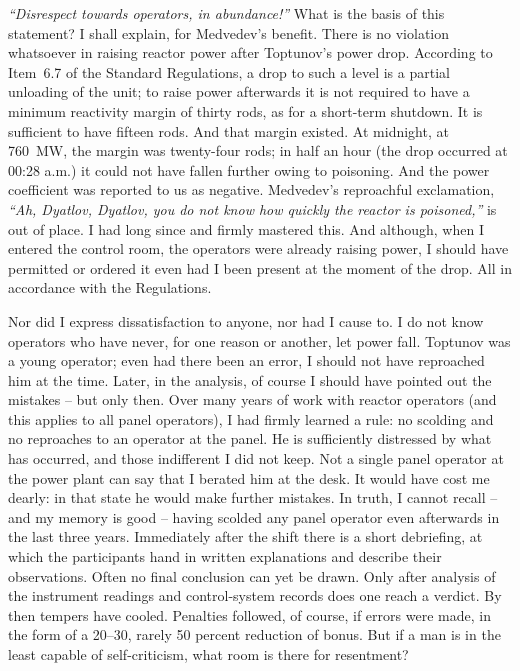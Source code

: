 \documentclass[openright]{bookest}
\begin{document}
\textit{``Disrespect towards operators, in abundance!''} What is the basis of this statement? I shall explain, for Medvedev's benefit. There is no violation whatsoever in raising reactor power after Toptunov's power drop. According to Item~6.7 of the Standard Regulations, a drop to such a level is a partial unloading of the unit; to raise power afterwards it is not required to have a minimum reactivity margin of thirty rods, as for a short-term shutdown. It is sufficient to have fifteen rods. And that margin existed. At midnight, at \qty{760}{\mega\watt}, the margin was twenty-four rods; in half an hour (the drop occurred at 00:28 a.m.) it could not have fallen further owing to poisoning. And the power coefficient was reported to us as negative. Medvedev's reproachful exclamation, \textit{``Ah, Dyatlov, Dyatlov, you do not know how quickly the reactor is poisoned,''} is out of place. I had long since and firmly mastered this. And although, when I entered the control room, the operators were already raising power, I should have permitted or ordered it even had I been present at the moment of the drop. All in accordance with the Regulations.

Nor did I express dissatisfaction to anyone, nor had I cause to. I do not know operators who have never, for one reason or another, let power fall. Toptunov was a young operator; even had there been an error, I should not have reproached him at the time. Later, in the analysis, of course I should have pointed out the mistakes -- but only then. Over many years of work with reactor operators (and this applies to all panel operators), I had firmly learned a rule: no scolding and no reproaches to an operator at the panel. He is sufficiently distressed by what has occurred, and those indifferent I did not keep. Not a single panel operator at the power plant can say that I berated him at the desk. It would have cost me dearly: in that state he would make further mistakes. In truth, I cannot recall -- and my memory is good -- having scolded any panel operator even afterwards in the last three years. Immediately after the shift there is a short debriefing, at which the participants hand in written explanations and describe their observations. Often no final conclusion can yet be drawn. Only after analysis of the instrument readings and control-system records does one reach a verdict. By then tempers have cooled. Penalties followed, of course, if errors were made, in the form of a \numrange{20}{30}, rarely \num{50} percent reduction of bonus. But if a man is in the least capable of self-criticism, what room is there for resentment?
\end{document}
